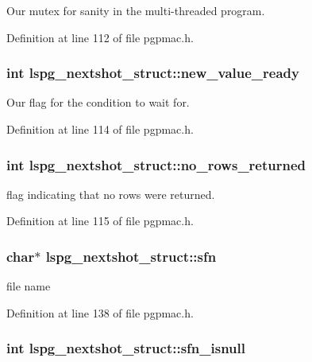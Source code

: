 Our mutex for sanity in the multi-\/threaded program. 

Definition at line 112 of file pgpmac.h.\hypertarget{structlspg__nextshot__struct_adb8da14444b98f556dba9420dd4666dc}{
\subsubsection[{new\_\-value\_\-ready}]{\setlength{\rightskip}{0pt plus 5cm}int {\bf lspg\_\-nextshot\_\-struct::new\_\-value\_\-ready}}}
\label{structlspg__nextshot__struct_adb8da14444b98f556dba9420dd4666dc}


Our flag for the condition to wait for. 

Definition at line 114 of file pgpmac.h.\hypertarget{structlspg__nextshot__struct_abc9242805729f70b83df79706c394c71}{
\subsubsection[{no\_\-rows\_\-returned}]{\setlength{\rightskip}{0pt plus 5cm}int {\bf lspg\_\-nextshot\_\-struct::no\_\-rows\_\-returned}}}
\label{structlspg__nextshot__struct_abc9242805729f70b83df79706c394c71}


flag indicating that no rows were returned. 

Definition at line 115 of file pgpmac.h.\hypertarget{structlspg__nextshot__struct_a03252bba597b081edc9d08b20b558cc7}{
\subsubsection[{sfn}]{\setlength{\rightskip}{0pt plus 5cm}char$\ast$ {\bf lspg\_\-nextshot\_\-struct::sfn}}}
\label{structlspg__nextshot__struct_a03252bba597b081edc9d08b20b558cc7}


file name 

Definition at line 138 of file pgpmac.h.\hypertarget{structlspg__nextshot__struct_a56f32eb413b1fca9f085874eb86294de}{
\subsubsection[{sfn\_\-isnull}]{\setlength{\rightskip}{0pt plus 5cm}int {\bf lspg\_\-nextshot\_\-struct::sfn\_\-isnull}}}
\label{structlspg__nextshot__struct_a56f32eb413b1fca9f085874eb86294de}


